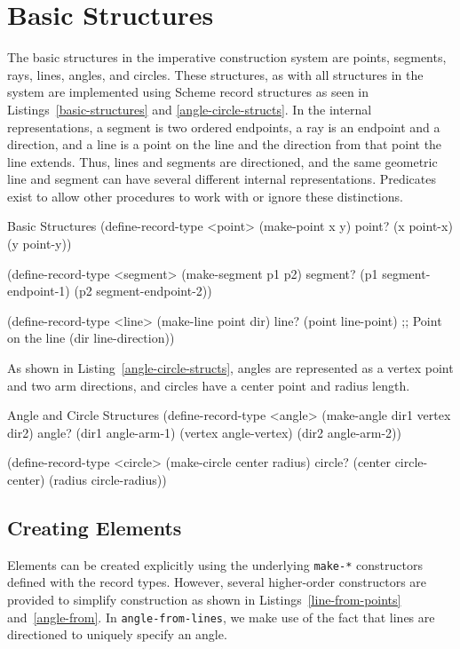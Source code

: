 \section{Basic Structures}

The basic structures in the imperative construction system are points,
segments, rays, lines, angles, and circles. These structures, as with
all structures in the system are implemented using Scheme record
structures as seen in Listings~\ref{basic-structures} and
\ref{angle-circle-structs}. In the internal representations, a segment
is two ordered endpoints, a ray is an endpoint and a direction, and a
line is a point on the line and the direction from that point the line
extends. Thus, lines and segments are directioned, and the same
geometric line and segment can have several different internal
representations. Predicates exist to allow other procedures to work
with or ignore these distinctions.

\begin{code-listing}
[label=basic-structures]
{Basic Structures}
(define-record-type <point>
  (make-point x y)
  point?
  (x point-x)
  (y point-y))

(define-record-type <segment>
  (make-segment p1 p2)
  segment?
  (p1 segment-endpoint-1)
  (p2 segment-endpoint-2))

(define-record-type <line>
  (make-line point dir)
  line?
  (point line-point) ;; Point on the line
  (dir line-direction))
\end{code-listing}

As shown in Listing~\ref{angle-circle-structs}, angles are represented
as a vertex point and two arm directions, and circles have a center
point and radius length.

\begin{code-listing}
[label=angle-circle-structs]
{Angle and Circle Structures}
(define-record-type <angle>
  (make-angle dir1 vertex dir2)
  angle?
  (dir1 angle-arm-1)
  (vertex angle-vertex)
  (dir2 angle-arm-2))

(define-record-type <circle>
  (make-circle center radius)
  circle?
  (center circle-center)
  (radius circle-radius))
\end{code-listing}

\subsection{Creating Elements}

Elements can be created explicitly using the underlying
\texttt{make-*} constructors defined with the record types. However,
several higher-order constructors are provided to simplify
construction as shown in Listings~\ref{line-from-points}
and~\ref{angle-from}.  In \texttt{angle-from-lines}, we make use of
the fact that lines are directioned to uniquely specify an angle.

